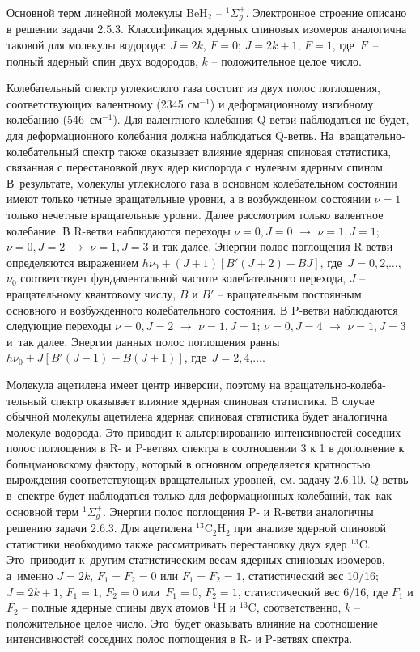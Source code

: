  Основной терм линейной молекулы $\text{BeH}_2$ – $^1\Sigma^+_g$. Электронное строение описано в решении задачи 2.5.3. Классификация ядерных спиновых изомеров аналогична таковой для молекулы водорода: $J=2k$, $F=0$; $J=2k+1$, $F=1$, где~$F$~– полный ядерный спин двух водородов, $k$ – положительное целое число.\par
{} Колебательный спектр углекислого газа состоит из двух полос поглощения, соответствующих валентному (2345 см$^{-1}$) и деформационному изгибному колебанию (546~см$^{-1}$). Для валентного колебания Q-ветви наблюдаться не будет, для деформационного колебания должна наблюдаться Q-ветвь. На~вращательно-колебательный спектр также оказывает влияние ядерная спиновая статистика, связанная с перестановкой двух ядер кислорода с нулевым ядерным спином. В~результате, молекулы углекислого газа в основном колебательном состоянии имеют только четные вращательные уровни, а в возбужденном состоянии $\nu = 1$ только нечетные вращательные уровни. Далее рассмотрим только валентное колебание. В R-ветви наблюдаются переходы $\nu = 0\text{,}\,J = 0$ $\rightarrow$ $\nu = 1\text{,}\,J = 1$; $\nu = 0\text{,}\,J = 2$ $\rightarrow$ $\nu = 1\text{,}\,J = 3$ и так далее. Энергии полос поглощения R-ветви определяются выражением $h\nu_0 + (J + 1)\left[ B'(J+2) - BJ\right]$, где~$J = 0\text{,}\,2\text{,}\ldots$, $\nu_0$ соответствует фундаментальной частоте колебательного перехода, $J$ – вращательному квантовому числу, $B$ и $B'$ – вращательным постоянным основного и возбужденного колебательного состояния. В P-ветви наблюдаются следующие переходы $\nu = 0\text{,}\,J = 2$ $\rightarrow$ $\nu = 1\text{,}\,J = 1$; $\nu = 0\text{,}\,J = 4$ $\rightarrow$ $\nu = 1\text{,}\,J = 3$ и~так далее. Энергии данных полос поглощения равны $h\nu_0 + J\left[ B'(J-1) - B(J+1)\right]$, где~$J = 2\text{,}\,4\text{,}\ldots$.\par
{} Молекула ацетилена имеет центр инверсии, поэтому на вращательно-колеба-тельный спектр оказывает влияние ядерная спиновая статистика. В случае обычной молекулы ацетилена ядерная спиновая статистика будет аналогична молекуле водорода. Это приводит к альтернированию интенсивностей соседних полос поглощения в R- и P-ветвях спектра в соотношении 3 к 1 в дополнение к больцмановскому фактору, который в основном определяется кратностью вырождения соответствующих вращательных уровней, см. задачу 2.6.10. Q\nobreakdash-ветвь в~спектре будет наблюдаться только для деформационных колебаний, так~как основной терм $^1\Sigma^+_g$. Энергии полос поглощения P- и R-ветви аналогичны решению задачи 2.6.3. Для ацетилена $^{13}\text{C}_2\text{H}_2$ при анализе ядерной спиновой статистики необходимо также рассматривать перестановку двух ядер $^{13}\text{C}$. Это~приводит к~другим статистическим весам ядерных спиновых изомеров, а~именно $J=2k$, $F_1=F_2=0$ или $F_1=F_2=1$, статистический вес 10/16; $J=2k+1$, $F_1=1$, $F_2=0$ или~$F_1=0$, $F_2=1$, статистический вес 6/16, где $F_1$ и $F_2$ – полные ядерные спины двух атомов $^{1}\text{H}$ и $^{13}\text{C}$, соответственно, $k$ – положительное целое число. Это~будет оказывать влияние на соотношение интенсивностей соседних полос поглощения в R- и P-ветвях спектра.\par
